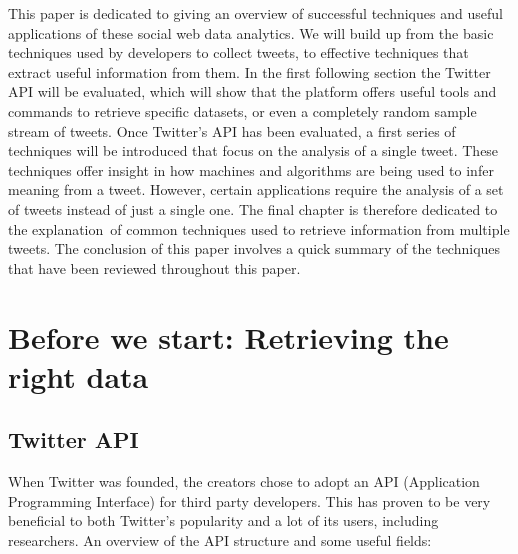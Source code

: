 \documentclass{article}
\begin{document}
This paper is dedicated to giving an overview of successful techniques and useful applications of these social web data analytics. 
We will build up from the basic techniques used by developers to collect tweets, to effective techniques that extract useful information from them. 
In the first following section the Twitter API will be evaluated, which will show that the platform offers useful tools and commands to retrieve 
specific datasets, or even a completely random sample stream of tweets. Once Twitter's API has been evaluated, a first series of techniques will be introduced
that focus on the analysis of a single tweet. These techniques offer insight in how machines and algorithms are being used to infer meaning from a tweet.
However, certain applications require the analysis of a set of tweets instead of just a single one. The final chapter is therefore dedicated to the explanation\
of common techniques used to retrieve information from multiple tweets. The conclusion of this paper involves a quick summary of the techniques that
have been reviewed throughout this paper.

\section{Before we start: Retrieving the right data}


\subsection{Twitter API}

When Twitter was founded, the creators chose to adopt an API (Application Programming Interface) for third party developers. This has proven to be very
beneficial to both Twitter's popularity and a lot of its users, including researchers. An overview of the API structure and some useful fields\cite{TwitterDev}:
\end{document}
